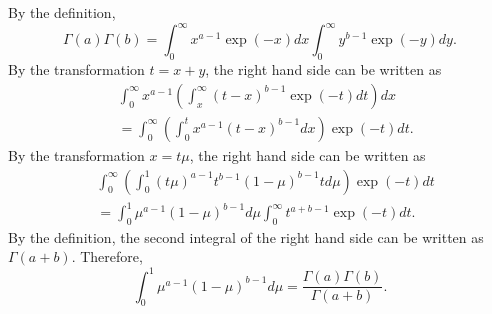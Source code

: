 \subsection{}
\label{2.5}
By the definition,
%
\begin{equation}
\Gamma (a) \Gamma (b) = \int_{0}^{\infty} x ^ {a - 1} \exp (- x) dx \int_{0}^{\infty} y ^ {b - 1} \exp (- y) dy.
\end{equation}
%
By the transformation $t = x + y$, the right hand side can be written as
%
\begin{equation}
\begin{aligned}
&\int_{0}^{\infty} x ^ {a - 1} \left( \int_{x}^{\infty} (t - x) ^ {b - 1} \exp (- t) dt \right) dx \\
&=  \int_{0}^{\infty} \left( \int_{0}^{t} x ^ {a - 1} (t - x) ^ {b - 1} dx \right) \exp (- t) dt.
\end{aligned}
\end{equation}
%
By the transformation $x = t \mu$, the right hand side can be written as
%
\begin{equation}
\begin{aligned}
&\int_{0}^{\infty} \left( \int_{0}^{1} (t \mu) ^ {a - 1} t ^ {b - 1} (1 - \mu) ^ {b - 1} t d\mu \right) \exp (- t) dt \\
&= \int_{0}^{1} \mu ^ {a - 1} (1 - \mu) ^ {b - 1} d\mu \int_{0}^{\infty} t ^ {a + b - 1} \exp ( - t ) dt.
\end{aligned}
\end{equation}
%
By the definition, the second integral of the right hand side  can be written as $\Gamma(a + b)$.
%
Therefore,
%
\begin{equation}
\int_{0}^{1} \mu ^ {a - 1} (1 - \mu) ^ {b - 1} d\mu = \frac{\Gamma (a) \Gamma (b)}{\Gamma (a + b)}.
\end{equation}
%


